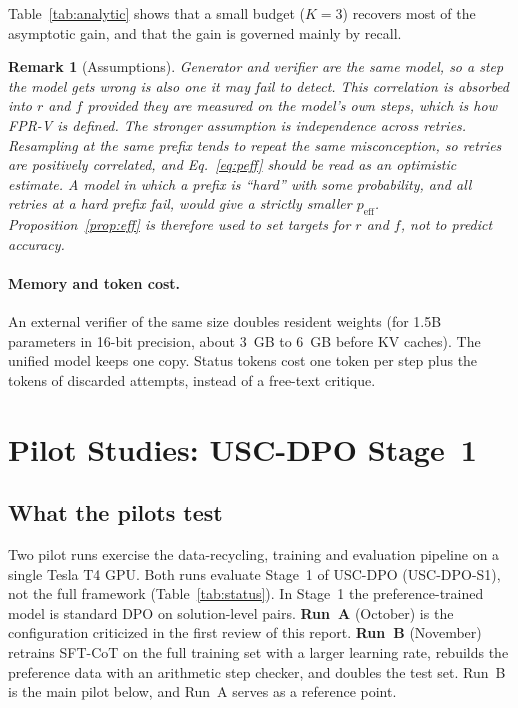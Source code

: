 \documentclass[11pt, a4paper]{article}
\newtheorem{remark}{Remark}
\newcommand{\soldpo}{USC-DPO-S1}
\begin{document}
Table~\ref{tab:analytic} shows that a small budget ($K=3$) recovers most of the asymptotic gain, and that the gain is governed mainly by recall.

\begin{remark}[Assumptions]
\label{rem:assump}
Generator and verifier are the same model, so a step the model gets wrong is also one it may fail to detect. This correlation is absorbed into $r$ and $f$ \emph{provided they are measured on the model's own steps}, which is how FPR-V is defined. The stronger assumption is independence across retries. Resampling at the same prefix tends to repeat the same misconception, so retries are positively correlated, and Eq.~\eqref{eq:peff} should be read as an optimistic estimate. A model in which a prefix is ``hard'' with some probability, and all retries at a hard prefix fail, would give a strictly smaller $p_{\text{eff}}$. Proposition~\ref{prop:eff} is therefore used to set targets for $r$ and $f$, not to predict accuracy.
\end{remark}

\paragraph{Memory and token cost.} An external verifier of the same size doubles resident weights (for 1.5B parameters in 16-bit precision, about 3~GB to 6~GB before KV caches). The unified model keeps one copy. Status tokens cost one token per step plus the tokens of discarded attempts, instead of a free-text critique.

\section{Pilot Studies: USC-DPO Stage~1}
\label{sec:pilot}
\subsection{What the pilots test}
Two pilot runs exercise the data-recycling, training and evaluation pipeline on a single Tesla T4 GPU. Both runs evaluate Stage~1 of USC-DPO (\soldpo{}), not the full framework (Table~\ref{tab:status}). In Stage~1 the preference-trained model is standard DPO on solution-level pairs. \textbf{Run~A} (October) is the configuration criticized in the first review of this report. \textbf{Run~B} (November) retrains SFT-CoT on the full training set with a larger learning rate, rebuilds the preference data with an arithmetic step checker, and doubles the test set. Run~B is the main pilot below, and Run~A serves as a reference point.
\end{document}
